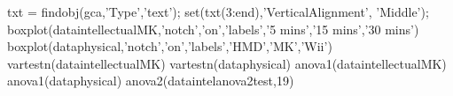 
txt = findobj(gca,'Type','text');
set(txt(3:end),'VerticalAlignment', 'Middle');
boxplot(dataintellectualMK,'notch','on','labels',{'5 mins','15 mins','30 mins'})
boxplot(dataphysical,'notch','on','labels',{'HMD','MK','Wii'})
vartestn(dataintellectualMK)
vartestn(dataphysical)
anova1(dataintellectualMK)
anova1(dataphysical)
anova2(dataintelanova2test,19)
